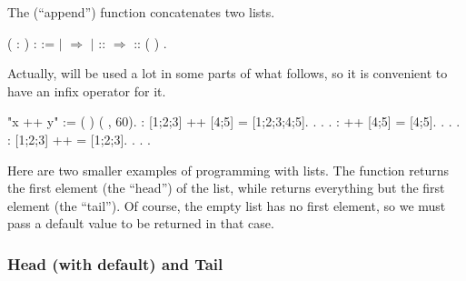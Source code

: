 \documentclass[12pt]{report}
\begin{document}
 The  (``append'') function concatenates two lists. \begin{coqdoccode}
\coqdocemptyline
\coqdocnoindent
{}  (  : ) :  := \coqdoceol
\coqdocindent{1.00em}
  \coqdoceol
\coqdocindent{1.00em}
\ensuremath{|}     \ensuremath{\Rightarrow} \coqdoceol
\coqdocindent{1.00em}
\ensuremath{|}  ::  \ensuremath{\Rightarrow}  :: (  )\coqdoceol
\coqdocindent{1.00em}
.\coqdoceol
\coqdocemptyline
\end{coqdoccode}
Actually,  will be used a lot in some parts of what
    follows, so it is convenient to have an infix operator for it. \begin{coqdoccode}
\coqdocemptyline
\coqdocnoindent
{} "x ++ y" := (  ) \coqdoceol
\coqdocindent{10.50em}
( ,   60).\coqdoceol
\coqdocemptyline
\coqdocnoindent
{} :             [1;2;3] ++ [4;5] = [1;2;3;4;5].\coqdoceol
\coqdocnoindent
{}. . .\coqdoceol
\coqdocnoindent
{} :              ++ [4;5] = [4;5].\coqdoceol
\coqdocnoindent
{}. . .\coqdoceol
\coqdocnoindent
{} :             [1;2;3] ++  = [1;2;3].\coqdoceol
\coqdocnoindent
{}. . .\coqdoceol
\coqdocemptyline
\end{coqdoccode}
Here are two smaller examples of programming with lists.
    The  function returns the first element (the ``head'') of the
    list, while  returns everything but the first
    element (the ``tail'').  
    Of course, the empty list has no first element, so we
    must pass a default value to be returned in that case.  

\subsubsection{Head (with default) and Tail}
\end{document}
